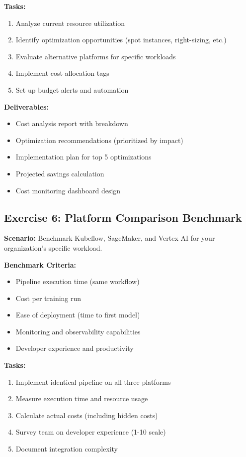 \textbf{Tasks:}
\begin{enumerate}
    \item Analyze current resource utilization
    \item Identify optimization opportunities (spot instances, right-sizing, etc.)
    \item Evaluate alternative platforms for specific workloads
    \item Implement cost allocation tags
    \item Set up budget alerts and automation
\end{enumerate}

\textbf{Deliverables:}
\begin{itemize}
    \item Cost analysis report with breakdown
    \item Optimization recommendations (prioritized by impact)
    \item Implementation plan for top 5 optimizations
    \item Projected savings calculation
    \item Cost monitoring dashboard design
\end{itemize}

\subsection{Exercise 6: Platform Comparison Benchmark}

\textbf{Scenario:} Benchmark Kubeflow, SageMaker, and Vertex AI for your organization's specific workload.

\textbf{Benchmark Criteria:}
\begin{itemize}
    \item Pipeline execution time (same workflow)
    \item Cost per training run
    \item Ease of deployment (time to first model)
    \item Monitoring and observability capabilities
    \item Developer experience and productivity
\end{itemize}

\textbf{Tasks:}
\begin{enumerate}
    \item Implement identical pipeline on all three platforms
    \item Measure execution time and resource usage
    \item Calculate actual costs (including hidden costs)
    \item Survey team on developer experience (1-10 scale)
    \item Document integration complexity
\end{enumerate}

